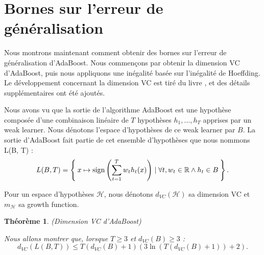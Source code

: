 \documentclass[12pt]{article}
\newcommand{\R}{\mathbb{R}}
\newtheorem{theorem}{Théorème}
\begin{document}
	\section{Bornes sur l’erreur de généralisation}
	
	Nous montrons maintenant comment obtenir des bornes sur l'erreur de généralisation d'AdaBoost.
	Nous commençons par obtenir la dimension VC d'AdaBoost, puis nous appliquons une inégalité basée sur l'inégalité de Hoeffding.
	Le développement concernant la dimension VC est tiré du livre \cite{Shalev-Shwartz2014-ba}, et des détails supplémentaires ont été ajoutés.
	
	Nous avons vu que la sortie de l'algorithme AdaBoost est une hypothèse composée d'une combinaison linéaire de $T$ hypothèses $h_1, ..., h_T$ apprises par un weak learner.
	Nous dénotons l'espace d'hypothèses de ce weak learner par $B$.
	La sortie d'AdaBoost fait partie de cet ensemble d'hypothèses que nous nommons L(B, T) :
	\[
	L(B, T) = \Set{ x \mapsto \text{sign}\left( \sum_{t=1}^T w_t h_t(x) \right) \mid \forall t, w_t \in \R \land h_t \in B}.
	\]
	
	Pour un espace d'hypothèses $\mathcal{H}$, nous dénotons $d_{VC}(\mathcal{H})$ sa dimension VC et $m_{\mathcal{H}}$ sa growth function.
	
	\begin{theorem}{(Dimension VC d'AdaBoost)}
		
		Nous allons montrer que, lorsque $T \geq 3$ et $d_{VC}(B) \geq 3$ :
		\[
		d_{VC}(L(B, T)) \leq T(d_{VC}(B) + 1) (3 \ln(T (d_{VC}(B) + 1)) + 2).
		\]
	\end{theorem}
\end{document}
